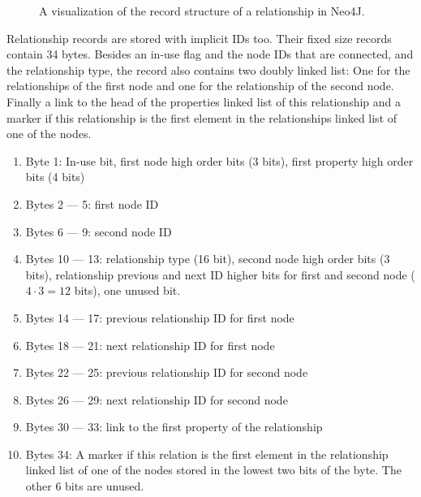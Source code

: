 \documentclass[a4paper,10pt]{article}
\begin{document}
\begin{figure}[htp]
\begin{center}
                \end{center}
                \caption{A visualization of the record structure of a relationship in Neo4J.} %
            \end{figure}
            
            Relationship records are stored with implicit IDs too. 
            Their fixed size records contain 34 bytes.
            Besides an in-use flag and the node IDs that are connected, and the relationship type, the record also contains two doubly linked list: One for the relationships of the first node and one for the relationship of the second node.
            Finally a link to the head of the properties linked list of this relationship and a marker if this relationship is the first element in the relationships linked list of one of the nodes.
            \newpage
            
            \begin{enumerate}
                \item Byte 1: In-use bit, first node high order bits (3 bits), first property high order bits (4 bits)
                \item Bytes 2 --- 5: first node ID 
                \item Bytes 6 --- 9: second node ID 
                \item Bytes 10 --- 13: relationship type (16 bit), second node high order bits (3 bits), relationship previous and next ID higher bits for first and second node ($4 \cdot 3 = 12$ bits), one unused bit.
                \item Bytes 14 --- 17: previous relationship ID for first node
                \item Bytes 18 --- 21: next relationship ID for first node
                \item Bytes 22 --- 25: previous relationship ID for second node
                \item Bytes 26 --- 29: next relationship ID for second node
                \item Bytes 30 --- 33: link to the first property of the relationship
                \item Bytes 34: A marker if this relation is the first element in the relationship linked list of one of the nodes stored in the lowest two bits of the byte. 
                    The other 6 bits are unused.
            \end{enumerate}
\end{document}
